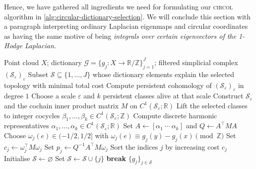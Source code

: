 \documentclass[a4paper,11pt, DIV=10]{scrartcl}
\numberwithin{equation}{section}
\theoremstyle{definition}
\theoremstyle{remark}
\newcommand{\Z}{\mathbb{Z}}
\newcommand{\R}{\mathbb{R}}
\begin{document}
Hence, we have gathered all ingredients we need for formulating our \textsc{circol} algorithm in \cref{alg:circular-dictionary-selection}.
We will conclude this section with a paragraph interpreting ordinary Laplacian eigenmaps and circular coordinates as having the same motive of being \emph{integrals over certain eigenvectors of the 1-Hodge Laplacian.}

\begin{algorithm}[tb]
\caption{The \textsc{circol} algorithm for selecting circular coordinates from a dictionary}
\label{alg:circular-dictionary-selection}
\begin{scriptsize}
	\begin{algorithmic}[1]
\Require Point cloud $X$; dictionary $\mathcal{G}=\{g_j\colon X\to \R/\Z\}_{j=1}^J$; filtered simplicial complex $(\mathcal{S}_\varepsilon)_\varepsilon$
\Ensure Subset $\mathcal{S}\subseteq \{1,\dots,J\}$ whose dictionary elements explain the selected topology with minimal total cost
\State Compute persistent cohomology of $(\mathcal{S}_\varepsilon)_\varepsilon$ in degree $1$
\State Choose a scale $\varepsilon$ and $k$ persistent classes alive at that scale
\State Construct $\mathcal{S}_\varepsilon$ and the cochain inner product matrix $M$ on $C^1(\mathcal{S}_\varepsilon;\R)$
\State Lift the selected classes to integer cocycles $\beta_1,\dots,\beta_k\in C^1(\mathcal{S}_\varepsilon;\Z)$
\State Compute discrete harmonic representatives $\alpha_1,\dots,\alpha_k\in C^1(\mathcal{S}_\varepsilon;\R)$
\State Set $A\gets[\alpha_1\ \cdots\ \alpha_k]$ and $Q\gets A^\top M A$
		\State Choose $\omega_j(e)\in(-1/2,1/2]$ with $\omega_j(e)\equiv g_j(y)-g_j(x)\pmod{\Z}$
	\EndFor
	\State Set $c_j\gets \omega_j^\top M\omega_j$
	\State Set $p_j\gets Q^{-1}A^\top M\omega_j$
\EndFor
\State Sort the indices $j$ by increasing cost $c_j$
\State Initialise $\mathcal{S}\gets\varnothing$
		\State Set $\mathcal{S}\gets\mathcal{S}\cup\{j\}$
	\EndIf
		\State \textbf{break}
	\EndIf
\EndFor
\State \Return $\{g_j\}_{j\in\mathcal{S}}$
\end{algorithmic}
\end{scriptsize}

\end{algorithm}
\end{document}

